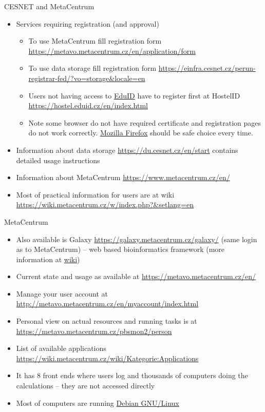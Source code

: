 \documentclass[compress, ucs, xelatex, 11pt, xcolor=svgnames,
  hyperref={
    bookmarks=true,
    unicode=true,
    colorlinks=true,
    pdftitle={Linux, command line and MetaCentrum},
    plainpages=false,
    pdfauthor={Vojtech Zeisek},
    pdfsubject={Course about use of Linux command line, writing shell scripts and using MetaCentrum of CESNET},
    pdfcreator={XeLaTeX},
    pdfkeywords={Linux, GNU, BASH, shell, command line, MetaCentrum},
    linkcolor=DarkRed,
    anchorcolor=DarkBlue,
    citecolor=Indigo,
    filecolor=NavyBlue,
    menucolor=DarkMagenta,
    urlcolor=DarkBlue,
    pdftex},
  url={hyphens, lowtilde} %
  ]{beamer}
\begin{document}
\begin{frame}[allowframebreaks]{CESNET and MetaCentrum}
\begin{itemize}
  \item Services requiring registration (and approval)
  \begin{itemize}
    \item To use MetaCentrum fill registration form \url{https://metavo.metacentrum.cz/en/application/form}
    \item To use data storage fill registration form \url{https://einfra.cesnet.cz/perun-registrar-fed/?vo=storage&locale=en}
    \item Users not having access to \href{https://www.eduid.cz/en/index}{EduID} have to register first at HostelID \url{https://hostel.eduid.cz/en/index.html}
    \item Note some browser do not have required certificate and registration pages do not work correctly. \href{https://www.mozilla.org/firefox/}{Mozilla Firefox} should be safe choice every time.
  \end{itemize}
  \item Information about data storage \url{https://du.cesnet.cz/en/start} contains detailed usage instructions
  \item Information about MetaCentrum \url{https://www.metacentrum.cz/en/}
  \item Most of practical information for users are at wiki \url{https://wiki.metacentrum.cz/w/index.php?&setlang=en}
\end{itemize}
\end{frame}

\begin{frame}{MetaCentrum}
\begin{itemize}
  \item Also available is Galaxy \url{https://galaxy.metacentrum.cz/galaxy/} (same login as to MetaCentrum) -- web based bioinformatics framework (more information at \href{https://wiki.metacentrum.cz/wiki/Galaxy_application}{wiki})
  \item Current state and usage as available at \url{https://metavo.metacentrum.cz/en/}
  \item Manage your user account at \url{http://metavo.metacentrum.cz/en/myaccount/index.html}
  \item Personal view on actual resources and running tasks is at \url{https://metavo.metacentrum.cz/pbsmon2/person}
  \item List of available applications \url{https://wiki.metacentrum.cz/wiki/Kategorie:Applications}
  \item It has 8 front ends where users log and thousands of computers doing the calculations -- they are not accessed directly
  \item Most of computers are running \href{https://www.debian.org/}{Debian GNU/Linux}
\end{itemize}
\end{frame}
\end{document}
